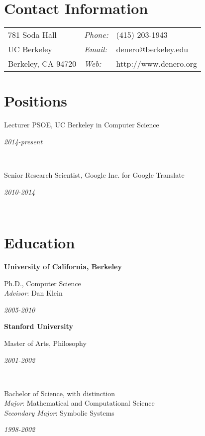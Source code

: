 \documentclass[margin,line]{res}
\newcommand{\dated}[2]{\parbox[t]{4.4in}{#1} \hspace{0.4in}
											 \parbox[t]{1in}{ {\it #2 } } }
\begin{document}

\begin{resume}

\section{\sc Contact Information}
\vspace{.05in}
\begin{tabular}{@{}p{2in}lp{4in}}
781 Soda Hall         & {\it Phone:} & (415) 203-1943        \\
UC Berkeley           & {\it Email:} & denero@berkeley.edu   \\
Berkeley, CA  94720   & {\it Web:}   & http://www.denero.org \\
\end{tabular}

\section{\sc Positions}

	\dated{Lecturer PSOE, UC Berkeley in Computer Science}
	{ 2014-present } \\

	\dated{Senior Research Scientist, Google Inc. for Google Translate}
	{ 2010-2014 } \\

\section{\sc Education}

	{\bf University of California, Berkeley} \\
	\dated{Ph.D., Computer Science \\
	\hspace*{1em} {\it Advisor}: Dan Klein}{ 2005-2010 }

	{\bf Stanford University} \\
	\dated{Master of Arts, Philosophy\vspace{0.12in}}{ 2001-2002 } \\
	\dated{Bachelor of Science, with distinction \\
	\hspace*{1em} {\it Major}: Mathematical and Computational Science \\
	\hspace*{1em} {\it Secondary Major}: Symbolic Systems}{ 1998-2002 }


\end{resume}
\end{document}
